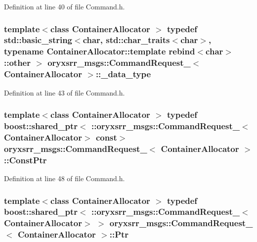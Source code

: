 \-Definition at line 40 of file \-Command.\-h.

\subsubsection[{\-\_\-data\-\_\-type}]{\setlength{\rightskip}{0pt plus 5cm}template$<$class Container\-Allocator $>$ typedef std\-::basic\-\_\-string$<$char, std\-::char\-\_\-traits$<$char$>$, typename \-Container\-Allocator\-::template rebind$<$char$>$\-::other $>$ {\bf oryxsrr\-\_\-msgs\-::\-Command\-Request\-\_\-}$<$ \-Container\-Allocator $>$\-::{\bf \-\_\-data\-\_\-type}}\label{structoryxsrr__msgs_1_1CommandRequest___aa4f6f0282a04c87813b40abe5caea7ce}


\-Definition at line 43 of file \-Command.\-h.

\subsubsection[{\-Const\-Ptr}]{\setlength{\rightskip}{0pt plus 5cm}template$<$class Container\-Allocator $>$ typedef boost\-::shared\-\_\-ptr$<$ \-::{\bf oryxsrr\-\_\-msgs\-::\-Command\-Request\-\_\-}$<$\-Container\-Allocator$>$ const$>$ {\bf oryxsrr\-\_\-msgs\-::\-Command\-Request\-\_\-}$<$ \-Container\-Allocator $>$\-::{\bf \-Const\-Ptr}}\label{structoryxsrr__msgs_1_1CommandRequest___a51f5e3732ed1b834217ba36a12737999}


\-Definition at line 48 of file \-Command.\-h.

\subsubsection[{\-Ptr}]{\setlength{\rightskip}{0pt plus 5cm}template$<$class Container\-Allocator $>$ typedef boost\-::shared\-\_\-ptr$<$ \-::{\bf oryxsrr\-\_\-msgs\-::\-Command\-Request\-\_\-}$<$\-Container\-Allocator$>$ $>$ {\bf oryxsrr\-\_\-msgs\-::\-Command\-Request\-\_\-}$<$ \-Container\-Allocator $>$\-::{\bf \-Ptr}}\label{structoryxsrr__msgs_1_1CommandRequest___a29993339bbd015a7cf93f583ddc2f0ee}


